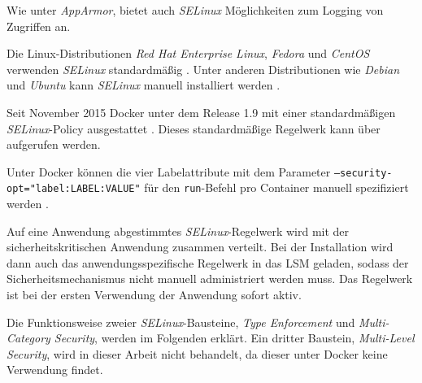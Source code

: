 \documentclass[../main.tex]{subfiles}
\begin{document}
				Wie unter \emph{AppArmor}, bietet auch \emph{SELinux} Möglichkeiten zum Logging von Zugriffen an.

				Die Linux-Distributionen \emph{Red Hat Enterprise Linux}, \emph{Fedora} und \emph{CentOS} verwenden \emph{SELinux} standardmäßig \cite{dockerSecurity}. Unter anderen Distributionen wie \emph{Debian} und \emph{Ubuntu} kann \emph{SELinux} manuell installiert werden \cite{selinuxDebian}\cite{selinuxUbuntu}.

				Seit November 2015 Docker unter dem Release 1.9 mit einer standardmäßigen \emph{SELinux}-Policy ausgestattet \cite{githubDockerChangelog}\cite{githubSELinuxPolicyIssue}.
				 Dieses standardmäßige Regelwerk kann über \cite{githubSELinuxProfile} aufgerufen werden.

				Unter Docker können die vier Labelattribute mit dem Parameter \texttt{--security-opt="{}label:LABEL:VALUE"{}} für den \texttt{run}-Befehl pro Container manuell spezifiziert werden \cite{dockerRun}.



				Auf eine Anwendung abgestimmtes \emph{SELinux}-Regelwerk wird mit der sicherheitskritischen Anwendung zusammen verteilt. Bei der Installation wird dann auch das anwendungsspezifische Regelwerk in das LSM geladen, sodass der Sicherheitsmechanismus nicht manuell administriert werden muss. Das Regelwerk ist bei der ersten Verwendung der Anwendung sofort aktiv.

				Die Funktionsweise zweier \emph{SELinux}-Bausteine, \emph{Type Enforcement} und \emph{Multi-Category Security}, werden im Folgenden erklärt. Ein dritter Baustein, \emph{Multi-Level Security}, wird in dieser Arbeit nicht behandelt, da dieser unter Docker keine Verwendung findet.


\end{document}
